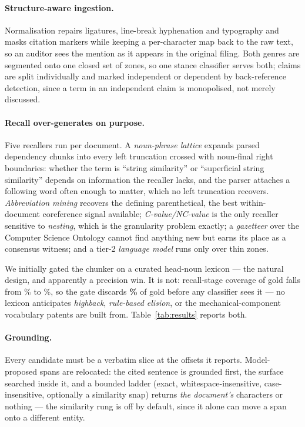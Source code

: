 \documentclass[11pt]{article}
\begin{document}
\paragraph{Structure-aware ingestion.} Normalisation repairs ligatures,
line-break hyphenation and typography and masks citation markers while keeping a
per-character map back to the raw text, so an auditor sees the mention as it
appears in the original filing. Both genres are segmented onto one closed set of
zones, so one stance classifier serves both; claims are split individually and
marked independent or dependent by back-reference detection, since a term in an
independent claim is monopolised, not merely discussed.

\paragraph{Recall over-generates on purpose.} Five recallers run per document. A
\emph{noun-phrase lattice} expands parsed dependency chunks into every left
truncation crossed with noun-final right boundaries: whether the term is ``string
similarity'' or ``superficial string similarity'' depends on information the
recaller lacks, and the parser attaches a following word often enough to matter,
which no left truncation recovers. \emph{Abbreviation mining} \cite{schwartz2003abbrev}
recovers the defining parenthetical, the best within-document coreference signal
available; \emph{C-value/NC-value} \cite{frantzi2000cvalue} is the only recaller
sensitive to \emph{nesting}, which is the granularity problem exactly; a
\emph{gazetteer} over the Computer Science Ontology \cite{salatino2020cso}
cannot find anything new but earns its place as a consensus witness; and a tier-2
\emph{language model} runs only over thin zones.

We initially gated the chunker on a curated head-noun lexicon --- the natural
design, and apparently a precision win. It is not: recall-stage coverage of gold
falls from \CoverageOpen\% to \CoverageGated\%, so the gate discards
\textbf{\GateDrops\%} of gold before any classifier sees it --- no lexicon
anticipates \emph{highback}, \emph{rule-based elision}, or the
mechanical-component vocabulary patents are built from. Table~\ref{tab:results}
reports both.

\paragraph{Grounding.} Every candidate must be a verbatim slice at the offsets it
reports. Model-proposed spans are relocated: the cited sentence is grounded
first, the surface searched inside it, and a bounded ladder (exact,
whitespace-insensitive, case-insensitive, optionally a similarity snap) returns
\emph{the document's} characters or nothing --- the similarity rung is off by
default, since it alone can move a span onto a different entity.
\end{document}

